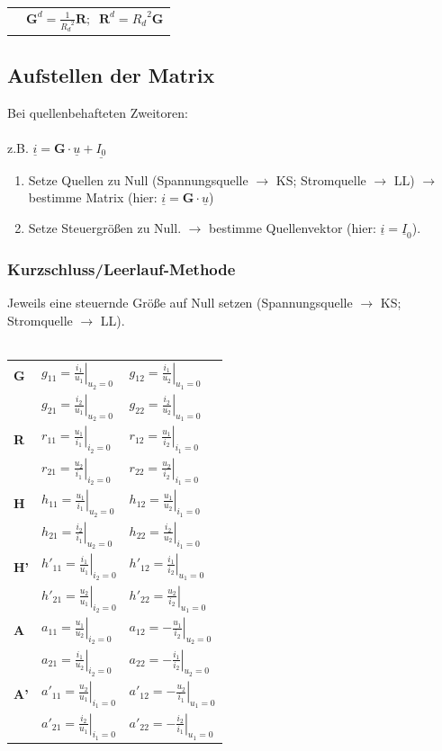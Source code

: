 \documentclass[a4paper,twocolumn,10pt]{article}
\begin{document}
\begin{tabular}{ll}
& $\textbf{G}^d=\frac{1}{{R_d}^2}\textbf{R};\;\;\textbf{R}^d={R_d}^2\textbf{G}$
\end{tabular}

\subsection*{Aufstellen der Matrix}
Bei quellenbehafteten Zweitoren:\\\\
z.B. $\underline{i}=\textbf{G}\cdot \underline{u}+\underline{I_0}$
\begin{enumerate}
	\item Setze Quellen zu Null (Spannungsquelle $\rightarrow$ KS; Stromquelle $\rightarrow$ LL) $\rightarrow$ bestimme Matrix (hier: $\underline{i}=\textbf{G}\cdot \underline{u}$)
	\item Setze Steuergrößen zu Null. $\rightarrow$ bestimme Quellenvektor (hier: $\underline{i}=\underline{I}_0$).
\end{enumerate}

\subsubsection*{Kurzschluss/Leerlauf-Methode}
Jeweils eine steuernde Größe auf Null setzen (Spannungsquelle $\rightarrow$ KS; Stromquelle $\rightarrow$ LL).\\\\
\begin{tabular}{lll}
\textbf{G} & $g_{11}=\left.\frac{i_1}{u_1}\right|_{u_2=0}$ & $g_{12}=\left.\frac{i_1}{u_2}\right|_{u_1=0}$\\
 & $g_{21}=\left.\frac{i_2}{u_1}\right|_{u_2=0}$ & $g_{22}=\left.\frac{i_2}{u_2}\right|_{u_1=0}$\\
\textbf{R} & $r_{11}=\left.\frac{u_1}{i_1}\right|_{i_2=0}$ & $r_{12}=\left.\frac{u_1}{i_2}\right|_{i_1=0}$\\
 & $r_{21}=\left.\frac{u_2}{i_1}\right|_{i_2=0}$ & $r_{22}=\left.\frac{u_2}{i_2}\right|_{i_1=0}$\\
\textbf{H} & $h_{11}=\left.\frac{u_1}{i_1}\right|_{u_2=0}$ & $h_{12}=\left.\frac{u_1}{u_2}\right|_{i_1=0}$\\
 & $h_{21}=\left.\frac{i_2}{i_1}\right|_{u_2=0}$ & $h_{22}=\left.\frac{i_2}{u_2}\right|_{i_1=0}$\\
\textbf{H'} & $h'_{11}=\left.\frac{i_1}{u_1}\right|_{i_2=0}$ & $h'_{12}=\left.\frac{i_1}{i_2}\right|_{u_1=0}$\\
 & $h'_{21}=\left.\frac{u_2}{u_1}\right|_{i_2=0}$ & $h'_{22}=\left.\frac{u_2}{i_2}\right|_{u_1=0}$\\
\textbf{A} & $a_{11}=\left.\frac{u_1}{u_2}\right|_{i_2=0}$ & $a_{12}=\left.-\frac{u_1}{i_2}\right|_{u_2=0}$\\
 & $a_{21}=\left.\frac{i_1}{u_2}\right|_{i_2=0}$ & $a_{22}=\left.-\frac{i_1}{i_2}\right|_{u_2=0}$\\
\textbf{A'} & $a'_{11}=\left.\frac{u_2}{u_1}\right|_{i_1=0}$ & $a'_{12}=\left.-\frac{u_2}{i_1}\right|_{u_1=0}$\\
 & $a'_{21}=\left.\frac{i_2}{u_1}\right|_{i_1=0}$ & $a'_{22}=\left.-\frac{i_2}{i_1}\right|_{u_1=0}$
\end{tabular}
\end{document}

